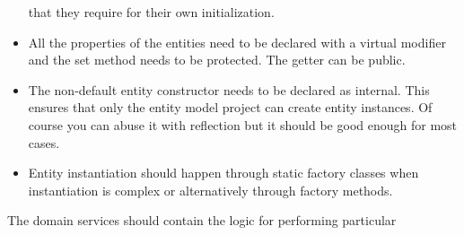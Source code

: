 \documentclass{article}
\begin{document}
\begin{itemize}
     that they require for their own initialization.
   \item All the properties of the entities need to be declared with a
     virtual modifier and the set method needs to be protected. The
     getter can be public.
   \item The non-default entity constructor needs to be declared as
     internal. This ensures that only the entity model project can
     create entity instances. Of course you can abuse it with
     reflection but it should be good enough for most cases.
   \item Entity instantiation should happen through static factory
     classes when instantiation is complex or alternatively through
     factory methods.

\end{itemize}


The domain services should contain the logic for performing particular
\end{document}
